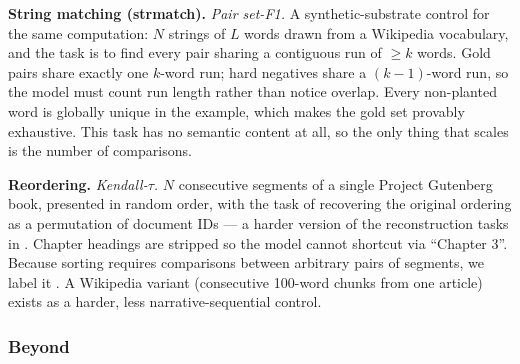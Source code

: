 \textbf{String matching (strmatch).} \emph{Pair set-F1.} A synthetic-substrate control for the same computation: $N$ strings of $L$ words drawn from a Wikipedia vocabulary, and the task is to find every pair sharing a contiguous run of $\geq k$ words. Gold pairs share exactly one $k$-word run; hard negatives share a $(k{-}1)$-word run, so the model must count run length rather than notice overlap. Every non-planted word is globally unique in the example, which makes the gold set provably exhaustive. This task has no semantic content at all, so the only thing that scales is the number of comparisons.



\textbf{Reordering.} \emph{Kendall-$\tau$.} $N$ consecutive segments of a single Project Gutenberg book, presented in random order, with the task of recovering the original ordering as a permutation of document IDs --- a harder version of the reconstruction tasks in \citet{Chen2026LongBenchPA}. Chapter headings are stripped so the model cannot shortcut via ``Chapter 3''. Because sorting requires comparisons between arbitrary pairs of segments, we label it . A Wikipedia variant (consecutive 100-word chunks from one article) exists as a harder, less narrative-sequential control.

\subsubsection{Beyond \texorpdfstring{}{OT(N2)}}



